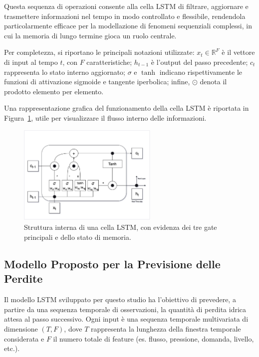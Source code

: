 \documentclass{article}
\begin{document}
Questa sequenza di operazioni consente alla cella LSTM di filtrare, aggiornare e trasmettere informazioni nel tempo in modo controllato e flessibile, rendendola particolarmente efficace per la modellazione di fenomeni sequenziali complessi, in cui la memoria di lungo termine gioca un ruolo centrale.

Per completezza, si riportano le principali notazioni utilizzate: $x_t \in \mathbb{R}^F$ è il vettore di input al tempo $t$, con $F$ caratteristiche; $h_{t-1}$ è l’output del passo precedente; $c_t$ rappresenta lo stato interno aggiornato; $\sigma$ e $\tanh$ indicano rispettivamente le funzioni di attivazione sigmoide e tangente iperbolica; infine, $\odot$ denota il prodotto elemento per elemento.

Una rappresentazione grafica del funzionamento della cella LSTM è riportata in Figura~\ref{fig:lstm_cell}, utile per visualizzare il flusso interno delle informazioni.

\begin{figure}[htbp]
    \centering
    \includegraphics[width=0.6\textwidth]{img/LSTM.png}
    \caption{Struttura interna di una cella LSTM, con evidenza dei tre gate principali e dello stato di memoria.}
    \label{fig:lstm_cell}
\end{figure}

\subsection{Modello Proposto per la Previsione delle Perdite}

Il modello LSTM sviluppato per questo studio ha l'obiettivo di prevedere, a partire da una sequenza temporale di osservazioni, la quantità di perdita idrica attesa al passo successivo. Ogni input è una sequenza temporale multivariata di dimensione $(T, F)$, dove $T$ rappresenta la lunghezza della finestra temporale considerata e $F$ il numero totale di feature (es. flusso, pressione, domanda, livello, etc.).
\end{document}
